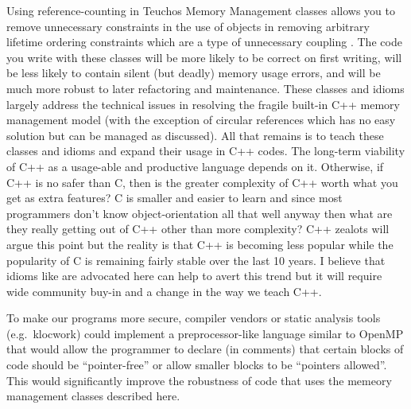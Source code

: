 \documentclass[pdf,ps2pdf,11pt]{SANDreport}
\begin{document}
Using reference-counting in Teuchos Memory Management classes allows
you to remove unnecessary constraints in the use of objects in
removing arbitrary lifetime ordering constraints which are a type of
unnecessary coupling {}\cite{CodeComplete2nd04}.  The code you write
with these classes will be more likely to be correct on first writing,
will be less likely to contain silent (but deadly) memory usage
errors, and will be much more robust to later refactoring and
maintenance.  These classes and idioms largely address the technical
issues in resolving the fragile built-in C++ memory management model
(with the exception of circular references which has no easy solution
but can be managed as discussed).  All that remains is to teach these
classes and idioms and expand their usage in C++ codes.  The long-term
viability of C++ as a usage-able and productive language depends on
it.  Otherwise, if C++ is no safer than C, then is the greater
complexity of C++ worth what you get as extra features?  C is smaller
and easier to learn and since most programmers don't know
object-orientation all that well anyway then what are they really
getting out of C++ other than more complexity?  C++ zealots will argue
this point but the reality is that C++ is becoming less popular while
the popularity of C is remaining fairly stable over the last 10 years.
I believe that idioms like are advocated here can help to avert this
trend but it will require wide community buy-in and a change in the
way we teach C++.

To make our programs more secure, compiler vendors or static analysis
tools (e.g.\ klocwork) could implement a preprocessor-like language
similar to OpenMP that would allow the programmer to declare (in
comments) that certain blocks of code should be ``pointer-free'' or
allow smaller blocks to be ``pointers allowed''.  This would
significantly improve the robustness of code that uses the memeory
management classes described here.



%

\clearpage
\providecommand*{\phantomsection}{}
\phantomsection
{}



%
\appendix
\end{document}
